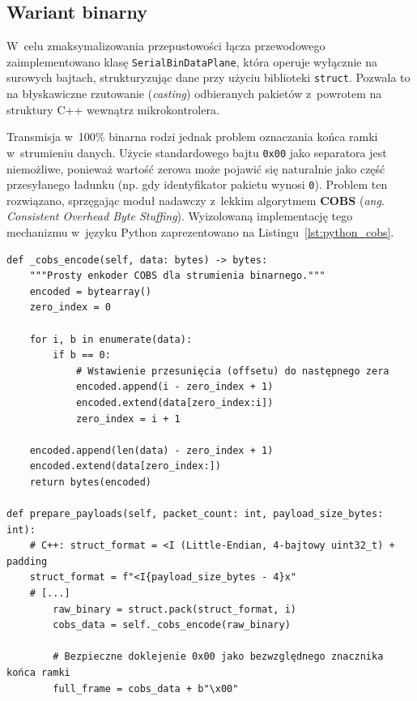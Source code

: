 \subsection{Wariant binarny}

W~celu zmaksymalizowania przepustowości łącza przewodowego zaimplementowano klasę \texttt{SerialBinDataPlane}, która operuje wyłącznie na surowych bajtach, strukturyzując dane przy użyciu biblioteki \texttt{struct}.
Pozwala to na błyskawiczne rzutowanie (\textit{casting}) odbieranych pakietów z~powrotem na struktury C++ wewnątrz mikrokontrolera.

Transmisja w~100\% binarna rodzi jednak problem oznaczania końca ramki w~strumieniu danych.
Użycie standardowego bajtu \texttt{0x00} jako separatora jest niemożliwe, ponieważ wartość zerowa może pojawić się naturalnie jako część przesyłanego ładunku (np. gdy identyfikator pakietu wynosi \texttt{0}).
Problem ten rozwiązano, sprzęgając moduł nadawczy z~lekkim algorytmem \textbf{COBS} (\textit{ang. Consistent Overhead Byte Stuffing}).
Wyizolowaną implementację tego mechanizmu w~języku Python zaprezentowano na Listingu~\ref{lst:python_cobs}.

\begin{listing}[htbp]
    \caption{Implementacja algorytmu COBS, eliminującego wystąpienia bajtu \texttt{0x00} z~ładunku użytecznego celem bezpiecznego ramkowania (\texttt{serial\_bin\_dp.py}) \cite{espy_nexus_python_host}}
    \label{lst:python_cobs}
    \begin{verbatim}
def _cobs_encode(self, data: bytes) -> bytes:
    """Prosty enkoder COBS dla strumienia binarnego."""
    encoded = bytearray()
    zero_index = 0

    for i, b in enumerate(data):
        if b == 0:
            # Wstawienie przesunięcia (offsetu) do następnego zera
            encoded.append(i - zero_index + 1)
            encoded.extend(data[zero_index:i])
            zero_index = i + 1

    encoded.append(len(data) - zero_index + 1)
    encoded.extend(data[zero_index:])
    return bytes(encoded)

def prepare_payloads(self, packet_count: int, payload_size_bytes: int):
    # C++: struct_format = <I (Little-Endian, 4-bajtowy uint32_t) + padding
    struct_format = f"<I{payload_size_bytes - 4}x"
    # [...]
        raw_binary = struct.pack(struct_format, i)
        cobs_data = self._cobs_encode(raw_binary)
        
        # Bezpieczne doklejenie 0x00 jako bezwzględnego znacznika końca ramki
        full_frame = cobs_data + b"\x00" 
\end{verbatim}
\end{listing}

